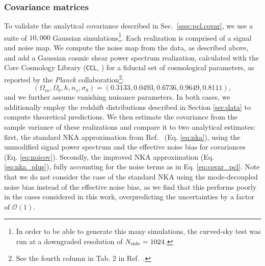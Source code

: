 \documentclass[a4paper,11pt]{article}
\newcommand{\cospar}{(\Omega_m, \allowbreak \Omega_b, \allowbreak h, \allowbreak n_s,\allowbreak \sigma_8)}
\newcommand{\planck}{{\sl Planck}}
\begin{document}
      \subsubsection{Covariance matrices}\label{ssec:results.method.covar}
        To validate the analytical covariance described in Sec.~\ref{ssec:pcl.covar}, we use a suite of $10{,}000$ Gaussian simulations\footnote{In order to be able to generate this many simulations, the curved-sky test was run at a downgraded resolution of $N_{\rm side}=1024$.}. Each realization is comprised of a signal and noise map. We compute the noise map from the data, as described above, and add a Gaussian cosmic shear power spectrum realization, calculated with the Core Cosmology Library ({\tt CCL}, \cite{1812.05995}) for a fiducial set of cosmological parameters, as reported by the \planck{} collaboration\footnote{See the fourth column in Tab. 2 in Ref.~\cite{1807.06209}.}:
        \begin{equation}\label{eq:planckcosmo}
          \cospar{} = (0.3133,\allowbreak 0.0493,\allowbreak 0.6736,\allowbreak 0.9649,\allowbreak 0.8111),
        \end{equation}
        and we further assume vanishing nuisance parameters. In both cases, we additionally employ the redshift distributions described in Section \ref{sec:data} to compute theoretical predictions. We then estimate the covariance from the sample variance of these realizations and compare it to two analytical estimates: first, the standard NKA approximation from Ref.~\cite{1906.11765} (Eq. \ref{eq:nka}), using the unmodified signal power spectrum and the effective noise bias for covariances (Eq. \ref{eq:noicov}). Secondly, the improved NKA approximation (Eq. \ref{eq:nka_plus}), fully accounting for the noise terms as in Eq. \ref{eq:covar_pcl}. Note that we do not consider the case of the standard NKA using the mode-decoupled noise bias instead of the effective noise bias, as we find that this performs poorly in the cases considered in this work, overpredicting the uncertainties by a factor of $\mathcal{O}(1)$.
\end{document}
